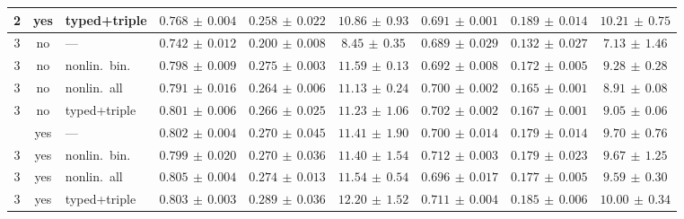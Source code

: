 \begin{table}[H]
{\begin{tabular}{ccl ccc ccc}
    2 & yes & typed+triple     & $0.768{\scriptstyle\,\pm\,0.004}$ & $0.258{\scriptstyle\,\pm\,0.022}$ & $10.86{\scriptstyle\,\pm\,0.93}$ & $0.691{\scriptstyle\,\pm\,0.001}$ & $0.189{\scriptstyle\,\pm\,0.014}$ & $10.21{\scriptstyle\,\pm\,0.75}$ \\
    \midrule
    3 & no  & ---              & $0.742{\scriptstyle\,\pm\,0.012}$ & $0.200{\scriptstyle\,\pm\,0.008}$ & $8.45{\scriptstyle\,\pm\,0.35}$ & $0.689{\scriptstyle\,\pm\,0.029}$ & $0.132{\scriptstyle\,\pm\,0.027}$ & $7.13{\scriptstyle\,\pm\,1.46}$ \\
    3 & no  & nonlin.\ bin.    & $0.798{\scriptstyle\,\pm\,0.009}$ & $0.275{\scriptstyle\,\pm\,0.003}$ & $11.59{\scriptstyle\,\pm\,0.13}$ & $0.692{\scriptstyle\,\pm\,0.008}$ & $0.172{\scriptstyle\,\pm\,0.005}$ & $9.28{\scriptstyle\,\pm\,0.28}$ \\
    3 & no  & nonlin.\ all     & $0.791{\scriptstyle\,\pm\,0.016}$ & $0.264{\scriptstyle\,\pm\,0.006}$ & $11.13{\scriptstyle\,\pm\,0.24}$ & $0.700{\scriptstyle\,\pm\,0.002}$ & $0.165{\scriptstyle\,\pm\,0.001}$ & $8.91{\scriptstyle\,\pm\,0.08}$ \\
    3 & no  & typed+triple     & $0.801{\scriptstyle\,\pm\,0.006}$ & $0.266{\scriptstyle\,\pm\,0.025}$ & $11.23{\scriptstyle\,\pm\,1.06}$ & $0.702{\scriptstyle\,\pm\,0.002}$ & $0.167{\scriptstyle\,\pm\,0.001}$ & $9.05{\scriptstyle\,\pm\,0.06}$ \\
    \addlinespace[2pt]
    3 & yes & ---              & $0.802{\scriptstyle\,\pm\,0.004}$ & $0.270{\scriptstyle\,\pm\,0.045}$ & $11.41{\scriptstyle\,\pm\,1.90}$ & $0.700{\scriptstyle\,\pm\,0.014}$ & $0.179{\scriptstyle\,\pm\,0.014}$ & $9.70{\scriptstyle\,\pm\,0.76}$ \\
    3 & yes & nonlin.\ bin.    & $0.799{\scriptstyle\,\pm\,0.020}$ & $0.270{\scriptstyle\,\pm\,0.036}$ & $11.40{\scriptstyle\,\pm\,1.54}$ & $0.712{\scriptstyle\,\pm\,0.003}$ & $0.179{\scriptstyle\,\pm\,0.023}$ & $9.67{\scriptstyle\,\pm\,1.25}$ \\
    3 & yes & nonlin.\ all     & $0.805{\scriptstyle\,\pm\,0.004}$ & $0.274{\scriptstyle\,\pm\,0.013}$ & $11.54{\scriptstyle\,\pm\,0.54}$ & $0.696{\scriptstyle\,\pm\,0.017}$ & $0.177{\scriptstyle\,\pm\,0.005}$ & $9.59{\scriptstyle\,\pm\,0.30}$ \\
    3 & yes & typed+triple     & $0.803{\scriptstyle\,\pm\,0.003}$ & $0.289{\scriptstyle\,\pm\,0.036}$ & $12.20{\scriptstyle\,\pm\,1.52}$ & $0.711{\scriptstyle\,\pm\,0.004}$ & $0.185{\scriptstyle\,\pm\,0.006}$ & $10.00{\scriptstyle\,\pm\,0.34}$ \\

\end{tabular}}
\end{table}
